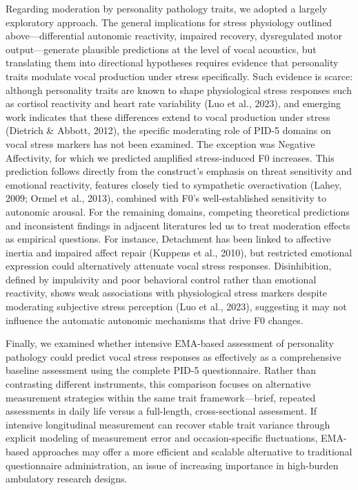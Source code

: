 \documentclass[
  english,
  man]{apa6}
\begin{document}
Regarding moderation by personality pathology traits, we adopted a largely exploratory approach. The general implications for stress physiology outlined above---differential autonomic reactivity, impaired recovery, dysregulated motor output---generate plausible predictions at the level of vocal acoustics, but translating them into directional hypotheses requires evidence that personality traits modulate vocal production under stress specifically. Such evidence is scarce: although personality traits are known to shape physiological stress responses such as cortisol reactivity and heart rate variability (Luo et al., 2023), and emerging work indicates that these differences extend to vocal production under stress (Dietrich \& Abbott, 2012), the specific moderating role of PID-5 domains on vocal stress markers has not been examined. The exception was Negative Affectivity, for which we predicted amplified stress-induced F0 increases. This prediction follows directly from the construct's emphasis on threat sensitivity and emotional reactivity, features closely tied to sympathetic overactivation (Lahey, 2009; Ormel et al., 2013), combined with F0's well-established sensitivity to autonomic arousal. For the remaining domains, competing theoretical predictions and inconsistent findings in adjacent literatures led us to treat moderation effects as empirical questions. For instance, Detachment has been linked to affective inertia and impaired affect repair (Kuppens et al., 2010), but restricted emotional expression could alternatively attenuate vocal stress responses. Disinhibition, defined by impulsivity and poor behavioral control rather than emotional reactivity, shows weak associations with physiological stress markers despite moderating subjective stress perception (Luo et al., 2023), suggesting it may not influence the automatic autonomic mechanisms that drive F0 changes.

Finally, we examined whether intensive EMA-based assessment of personality pathology could predict vocal stress responses as effectively as a comprehensive baseline assessment using the complete PID-5 questionnaire. Rather than contrasting different instruments, this comparison focuses on alternative measurement strategies within the same trait framework---brief, repeated assessments in daily life versus a full-length, cross-sectional assessment. If intensive longitudinal measurement can recover stable trait variance through explicit modeling of measurement error and occasion-specific fluctuations, EMA-based approaches may offer a more efficient and scalable alternative to traditional questionnaire administration, an issue of increasing importance in high-burden ambulatory research designs.
\end{document}

